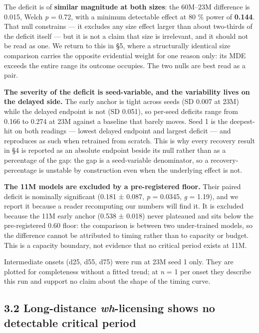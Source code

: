 \documentclass{article}
\begin{document}
The deficit is of \textbf{similar magnitude at both sizes}: the 60M--23M difference is 0.015,
Welch \emph{p} = 0.72, with a minimum detectable effect at 80 \% power of \textbf{0.144}. That null
constrains --- it excludes any size effect larger than about two-thirds of the deficit itself
--- but it is not a claim that size is irrelevant, and it should not be read as one. We
return to this in §5, where a structurally identical size comparison carries the opposite
evidential weight for one reason only: its MDE exceeds the entire range its outcome
occupies. The two nulls are best read as a pair.

\textbf{The severity of the deficit is seed-variable, and the variability lives on the delayed
side.} The early anchor is tight across seeds (SD 0.007 at 23M) while the delayed
endpoint is not (SD 0.051), so per-seed deficits range from 0.166 to 0.274 at 23M against a
baseline that barely moves. Seed 1 is the deepest-hit on both readings --- lowest delayed
endpoint and largest deficit --- and reproduces as such when retrained from scratch. This is
why every recovery result in §4 is reported as an absolute endpoint beside its null rather
than as a percentage of the gap: the gap is a seed-variable denominator, so a
recovery-percentage is unstable by construction even when the underlying effect is not.

\textbf{The 11M models are excluded by a pre-registered floor.} Their paired deficit is
nominally significant (0.181 ± 0.087, \emph{p} = 0.0345, \emph{g} = 1.19), and we report it because a
reader recomputing our numbers will find it. It is excluded because the 11M early anchor
(0.538 ± 0.018) never plateaued and sits below the pre-registered 0.60 floor: the
comparison is between two under-trained models, so the difference cannot be attributed to
timing rather than to capacity or budget. This is a capacity boundary, not evidence that no
critical period exists at 11M.

Intermediate onsets (d25, d55, d75) were run at 23M seed 1 only. They are plotted for
completeness without a fitted trend; at \emph{n} = 1 per onset they describe this run and support
no claim about the shape of the timing curve.

\subsection{\texorpdfstring{3.2 Long-distance \emph{wh}-licensing shows no detectable critical period}{3.2 Long-distance wh-licensing shows no detectable critical period}}\label{long-distance-wh-licensing-shows-no-detectable-critical-period}
\end{document}
